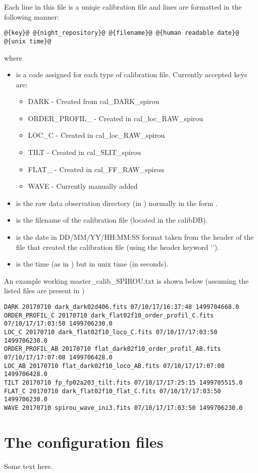 Each line in this file is a uniqie calibration file and lines are formatted in the following manner:
\begin{lstlisting}[style=text]
@{key}@ @{night_repository}@ @{filename}@ @{human readable date}@ @{unix time}@ 
\end{lstlisting}

\noindent where
\begin{itemize}
\item {} is a code assigned for each type of calibration file. Currently accepted keys are:
\begin{itemize}
\item DARK - Created from cal\_DARK\_spirou
\item ORDER\_PROFIL\_ - Created in cal\_loc\_RAW\_spirou
\item LOC\_C - Created in cal\_loc\_RAW\_spirou
\item TILT - Created in cal\_SLIT\_spirou
\item FLAT\_ - Created in cal\_FF\_RAW\_spirou
\item WAVE - Currently manually added
\end{itemize}

\item {} is the raw data observation directory (in ) normally in the form \constantFolderDateFormat.

\item {} is the filename of the calibration file (located in the calibDB).

\item {} is the date in DD/MM/YY/HH:MM:SS format taken from the header of the file that created the calibration file (using the header keyword `\constantAcqtimeKey').

\item {} is the time (as in ) but in unix time (in seconds).

\end{itemize}

\noindent An example working master\_calib\_SPIROU.txt is shown below (assuming the listed files are present in )
\begin{lstlisting}[style=text]
DARK 20170710 dark_dark02d406.fits 07/10/17/16:37:48 1499704668.0
ORDER_PROFIL_C 20170710 dark_flat02f10_order_profil_C.fits 07/10/17/17:03:50 1499706230.0
LOC_C 20170710 dark_flat02f10_loco_C.fits 07/10/17/17:03:50 1499706230.0
ORDER_PROFIL_AB 20170710 flat_dark02f10_order_profil_AB.fits 07/10/17/17:07:08 1499706428.0
LOC_AB 20170710 flat_dark02f10_loco_AB.fits 07/10/17/17:07:08 1499706428.0
TILT 20170710 fp_fp02a203_tilt.fits 07/10/17/17:25:15 1499705515.0
FLAT_C 20170710 dark_flat02f10_flat_C.fits 07/10/17/17:03:50 1499706230.0
WAVE 20170710 spirou_wave_ini3.fits 07/10/17/17:03:50 1499706230.0
\end{lstlisting}

\section{The configuration files}
\label{section:the_config_files}

Some text here.